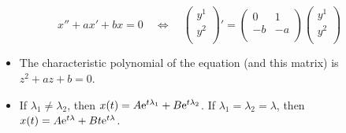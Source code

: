 \documentclass[../notes.tex]{subfiles}
\begin{document}
\begin{itemize}
\begin{equation*}
        x''+ax'+bx = 0
        \quad\Longleftrightarrow\quad
        \begin{pmatrix}
            y^1\\
            y^2\\
        \end{pmatrix}'
        =
        \begin{pmatrix}
            0 & 1\\
            -b & -a\\
        \end{pmatrix}
        \begin{pmatrix}
            y^1\\
            y^2\\
        \end{pmatrix}
    \end{equation*}
    \begin{itemize}
        \item The characteristic polynomial of the equation (and this matrix) is $z^2+az+b=0$.
        \item If $\lambda_1\neq\lambda_2$, then $x(t)=A\e[t\lambda_1]+B\e[t\lambda_2]$. If $\lambda_1=\lambda_2=\lambda$, then $x(t)=A\e[t\lambda]+Bt\e[t\lambda]$.
    \end{itemize}
\end{itemize}
\end{document}
